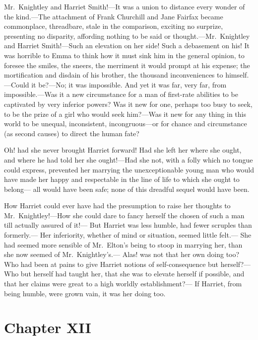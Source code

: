 Mr.\ Knightley and Harriet Smith!---It was a union to distance every
wonder of the kind.---The attachment of Frank Churchill and Jane
Fairfax became commonplace, threadbare, stale in the comparison,
exciting no surprize, presenting no disparity, affording nothing
to be said or thought.---Mr.\ Knightley and Harriet Smith!---Such an
elevation on her side!  Such a debasement on his!  It was horrible
to Emma to think how it must sink him in the general opinion,
to foresee the smiles, the sneers, the merriment it would prompt at
his expense; the mortification and disdain of his brother, the thousand
inconveniences to himself.---Could it be?---No; it was impossible.
And yet it was far, very far, from impossible.---Was it a new
circumstance for a man of first-rate abilities to be captivated by
very inferior powers?  Was it new for one, perhaps too busy to seek,
to be the prize of a girl who would seek him?---Was it new for any
thing in this world to be unequal, inconsistent, incongruous---or for
chance and circumstance (as second causes) to direct the human fate?

Oh! had she never brought Harriet forward!  Had she left her where
she ought, and where he had told her she ought!---Had she not,
with a folly which no tongue could express, prevented her marrying
the unexceptionable young man who would have made her happy
and respectable in the line of life to which she ought to belong---%
all would have been safe; none of this dreadful sequel would have been.

How Harriet could ever have had the presumption to raise
her thoughts to Mr.\ Knightley!---How she could dare to fancy
herself the chosen of such a man till actually assured of it!---%
But Harriet was less humble, had fewer scruples than formerly.---%
Her inferiority, whether of mind or situation, seemed little felt.---%
She had seemed more sensible of Mr.\ Elton's being to stoop
in marrying her, than she now seemed of Mr.\ Knightley's.---%
Alas! was not that her own doing too?  Who had been at pains to give
Harriet notions of self-consequence but herself?---Who but herself
had taught her, that she was to elevate herself if possible,
and that her claims were great to a high worldly establishment?---%
If Harriet, from being humble, were grown vain, it was her doing too.



\chapter{Chapter XII}


